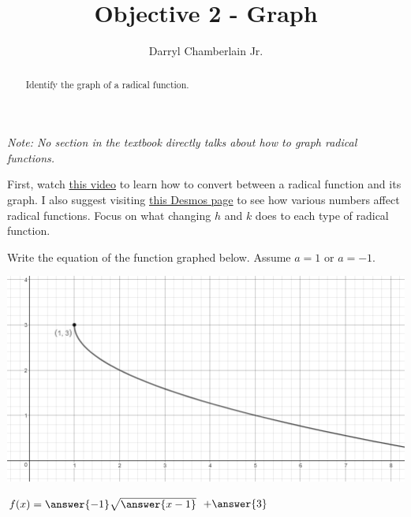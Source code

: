 \documentclass{ximera}
\author{Darryl Chamberlain Jr.}
\title{Objective 2 - Graph}
\begin{document}
\begin{abstract}
Identify the graph of a radical function.
\end{abstract}
\maketitle

\textit{Note: No section in the textbook directly talks about how to graph radical functions.}


First, watch \href{https://mediasite.video.ufl.edu/Mediasite/Play/1cefe335d5a94e4f9f6a5aacc58873111d}{this video} to learn how to convert between a radical function and its graph. I also suggest visiting \href{https://www.desmos.com/calculator/sa2j9mats1}{this Desmos page} to see how various numbers affect radical functions. Focus on what changing $h$ and $k$ does to each type of radical function.


\begin{question}
Write the equation of the function graphed below. Assume $a = 1$ or $a = -1$.  

\includegraphics{graphRadicalQ1.png}

$f(x) = \answer{-1} \sqrt{\answer{x-1}}$ $+ \answer{3}$ 

\end{question}
\end{document}
